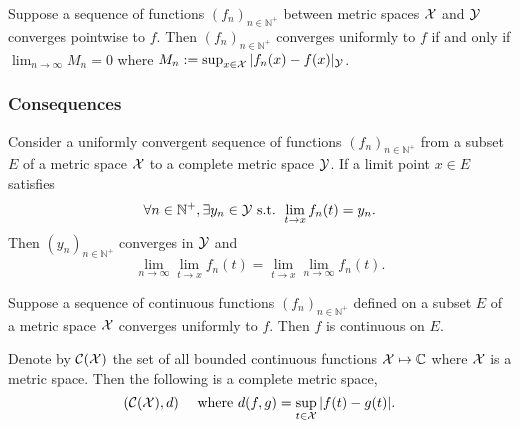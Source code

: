 \begin{lem}
  \label{lem:pointwise2uniformConvergence}
  Suppose a sequence of functions $(f_n)_{n\in\mathbb{N}^+}$ 
  between metric spaces ${\cal X}$ and ${\cal Y}$
  converges pointwise to $f$. %
  Then $(f_n)_{n\in\mathbb{N}^+}$ converges
  uniformly to $f$ if and only if
  $\lim_{n\rightarrow \infty} M_n =0$
  where $M_n:=\sup_{x\in {\cal X}}|f_n(x)-f(x)|_{\cal Y}$.
\end{lem}


\subsubsection{Consequences}


\begin{lem}
  \label{lem:uniformConvergenceAndCont}
  Consider a uniformly convergent sequence of functions
  $(f_n)_{n\in\mathbb{N}^+}$  %
  from a subset $E$ of a metric space ${\cal X}$
  to a complete metric space ${\cal Y}$. 
  If a limit point $x\in E$ satisfies
  \begin{equation}
    \label{eq:uniformConvergenceAndContCondition}
    \forall n\in\mathbb{N}^+, \exists y_n\in {\cal Y} \text{ s.t. }
    \lim_{t\rightarrow x}f_n(t) = y_n.
  \end{equation}
  Then $(y_n)_{n\in\mathbb{N}^+}$ converges in ${\cal Y}$
  and 
  \begin{equation}
    \label{eq:uniformConvergenceAndCont}
    \lim_{n\rightarrow\infty} \lim_{t\rightarrow x}f_n(t)
    = \lim_{t\rightarrow x}\lim_{n\rightarrow\infty}f_n(t).
  \end{equation}
\end{lem}


\begin{coro}
  \label{coro:uniformLimitIsCont}
  Suppose a sequence of continuous functions $(f_n)_{n\in\mathbb{N}^+}$ 
  defined on a subset $E$ of a metric space ${\cal X}$
  converges uniformly to $f$.
  Then $f$ is continuous on $E$.
\end{coro}


\begin{coro}
  \label{coro:CXisComplete}
  Denote by ${\cal C}({\cal X})$
  the set of all bounded continuous functions
  ${\cal X}\mapsto \mathbb{C}$
  where ${\cal X}$ is a metric space.
  Then the following is a complete metric space,
  \begin{equation}
    \label{eq:CXcomplete}
    ({\cal C}({\cal X}),d)\quad \text{ where }
    d(f,g)=\sup_{t\in {\cal X}}|f(t)-g(t)|. 
  \end{equation}
\end{coro}


